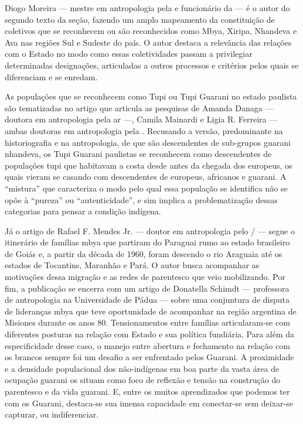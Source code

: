 Diogo Moreira --- mestre em antropologia pela  e funcionário da 
--- é o autor do segundo texto da seção, fazendo um amplo mapeamento da
constituição de coletivos que se reconhecem ou são reconhecidos como
Mbya, Xiripa, Nhandeva e Ava nas regiões Sul e Sudeste do país. O autor
destaca a relevância das relações com o Estado no modo como essas
coletividades passam a privilegiar determinadas designações,
articuladas a outros processos e critérios pelos quais se diferenciam e
se enredam. 

As populações que se reconhecem como Tupi ou Tupi Guarani no estado
paulista são tematizadas no artigo que articula as pesquisas de Amanda
Danaga --- doutora em antropologia pela ar ---, Camila Mainardi e Ligia
R. Ferreira --- ambas doutoras em antropologia pela . Recusando a
versão, predominante na historiografia e na antropologia, de que são
descendentes de sub-grupos guarani nhandeva, os Tupi Guarani paulistas
se reconhecem como descendentes de populações tupi que habitavam a
costa desde antes da chegada dos europeus, os quais vieram se casando
com descendentes de europeus, africanos e guarani. A ``mistura'' que
caracteriza o modo pelo qual essa população se identifica não se opõe à
``pureza'' ou ``autenticidade'', e sim implica a problematização dessas
categorias para pensar a condição indígena. 

Já o artigo de Rafael F. Mendes Jr. --- doutor em antropologia pelo
/ --- segue o itinerário de famílias mbya que partiram do Paraguai
rumo ao estado brasileiro de Goiás e, a partir da década de 1960, foram
descendo o rio Araguaia até os estados de Tocantins, Maranhão e Pará. O
autor busca acompanhar as motivações dessa migração e as redes de
parentesco que veio mobilizando. Por fim, a publicação se encerra com
um artigo de Donatella Schimdt --- professora de antropologia na
Universidade de Pádua --- sobre uma conjuntura de disputa de lideranças
mbya que teve oportunidade de acompanhar na região argentina de
Misiones durante os anos 80. Tensionamentos entre famílias
articularam-se com diferentes posturas na relação com Estado e sua
política fundiária. Para além da especificidade desse caso, o manejo
entre abertura e fechamento na relação com os brancos sempre foi um
desafio a ser enfrentado pelos Guarani. A proximidade e a densidade
populacional dos não-indígenas em boa parte da vasta área de ocupação
guarani os situam como foco de reflexão e tensão na construção do
parentesco e da vida guarani. E, entre os muitos aprendizados que
podemos ter com os Guarani, destaca-se sua imensa capacidade em
conectar-se sem deixar-se capturar, ou indiferenciar.

